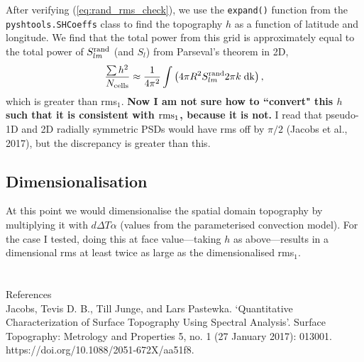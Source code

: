 \documentclass[10pt]{article}
\begin{document}
After verifying (\ref{eq:rand_rms_check}), we use the {\tt expand()} function from the {\tt pyshtools.SHCoeffs} class to find the topography $h$ as a function of latitude and longitude. We find that the total power from this grid is approximately equal to the total power of $S_{lm}^{\rm rand}$ (and $S_l$) from Parseval's theorem in 2D,
\begin{equation}
\frac{\sum h^2}{ N_{\rm cells}} \approx \frac{1}{4\pi^2}\int\left(4 \pi R^2 S_{lm}^{\rm rand} 2\pi k \; \rm{d}k \right),
\end{equation}
which is greater than rms$_1$. \textbf{Now I am not sure how to ``convert" this $h$ such that it is consistent with ${\rm rms}_1$, because it is not.} I read that pseudo-1D and 2D radially symmetric PSDs would have rms off by $\pi/2$ (Jacobs et al., 2017), but the discrepancy is greater than this.

\subsection{Dimensionalisation}

At this point we would dimensionalise the spatial domain topography by multiplying it with $d \Delta T \alpha$ (values from the parameterised convection model). For the case I tested, doing this at face value---taking $h$ as above---results in a dimensional rms at least twice as large as the dimensionalised rms$_1$.\\ \\ \\

\noindent References \\

\noindent Jacobs, Tevis D. B., Till Junge, and Lars Pastewka. ‘Quantitative Characterization of Surface Topography Using Spectral Analysis’. Surface Topography: Metrology and Properties 5, no. 1 (27 January 2017): 013001. https://doi.org/10.1088/2051-672X/aa51f8.
\end{document}
